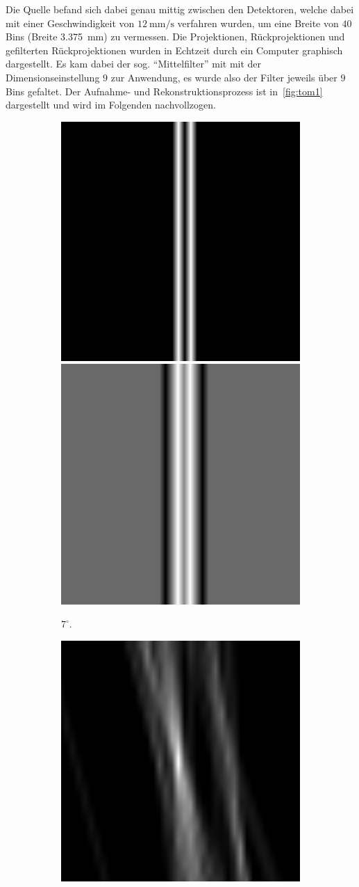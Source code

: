 \documentclass[slug=PET, room=Andreas-Schubert-Bau\,\ 424A, supervisor=Carsten\ Bittrich, coursedate=10.\ 01.\ 2020]{../../Lab_Report_LaTeX/lab_report}
\begin{document}
Die Quelle befand sich dabei genau mittig zwischen den Detektoren,
welche dabei mit einer Geschwindigkeit von
\(\SI{12}{\milli\metre\per\second}\) verfahren wurden, um eine Breite
von \(40\) Bins (Breite \SI{3.375}{\milli\meter}) zu vermessen. Die
Projektionen, R\"uckprojektionen und gefilterten R\"uckprojektionen
wurden in Echtzeit durch ein Computer graphisch dargestellt. Es kam
dabei der sog. ``Mittelfilter'' mit mit der Dimensionseinstellung
\(9\) zur Anwendung, es wurde also der Filter jeweils \"uber \(9\)
Bins gefaltet. Der Aufnahme- und Rekonstruktionsprozess ist
in~\ref{fig:tom1} dargestellt und wird im Folgenden nachvollzogen.

\begin{figure}[htp]
  \begin{subfigure}{0.5\textwidth}
    \centering
    \includegraphics[width=.4\textwidth]{../messungen/oliTOM1/1_einfach.png}
    \includegraphics[width=.4\textwidth]{../messungen/oliTOM1/1_gefiltert.png}
    \caption{\(7^\circ\).}
    \label{eq:tom1-7}
  \end{subfigure}
  \begin{subfigure}{0.5\textwidth}
    \centering
    \includegraphics[width=.4\textwidth]{../messungen/oliTOM1/3_einfach.png}

\end{subfigure}
\end{figure}
\end{document}
